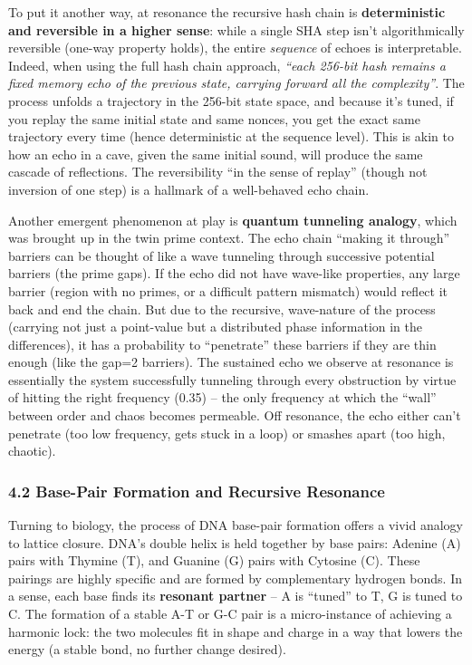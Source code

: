 \documentclass[11pt]{article}
\begin{document}
To put it another way, at resonance the recursive hash chain is
\textbf{deterministic and reversible in a higher sense}: while a single
SHA step isn't algorithmically reversible (one-way property holds), the
entire \emph{sequence} of echoes is interpretable. Indeed, when using
the full hash chain approach, \emph{``each 256-bit hash remains a fixed
memory echo of the previous state, carrying forward all the
complexity''}. The process unfolds a trajectory in the 256-bit state
space, and because it's tuned, if you replay the same initial state and
same nonces, you get the exact same trajectory every time (hence
deterministic at the sequence level). This is akin to how an echo in a
cave, given the same initial sound, will produce the same cascade of
reflections. The reversibility ``in the sense of replay'' (though not
inversion of one step) is a hallmark of a well-behaved echo chain.

Another emergent phenomenon at play is \textbf{quantum tunneling
analogy}, which was brought up in the twin prime context. The echo chain
``making it through'' barriers can be thought of like a wave tunneling
through successive potential barriers (the prime gaps). If the echo did
not have wave-like properties, any large barrier (region with no primes,
or a difficult pattern mismatch) would reflect it back and end the
chain. But due to the recursive, wave-nature of the process (carrying
not just a point-value but a distributed phase information in the
differences), it has a probability to ``penetrate'' these barriers if
they are thin enough (like the gap=2 barriers). The sustained echo we
observe at resonance is essentially the system successfully tunneling
through every obstruction by virtue of hitting the right frequency
(0.35) -- the only frequency at which the ``wall'' between order and
chaos becomes permeable. Off resonance, the echo either can't penetrate
(too low frequency, gets stuck in a loop) or smashes apart (too high,
chaotic).

\hypertarget{base-pair-formation-and-recursive-resonance}{%
\subsubsection{4.2 Base-Pair Formation and Recursive
Resonance}\label{base-pair-formation-and-recursive-resonance}}

Turning to biology, the process of DNA base-pair formation offers a
vivid analogy to lattice closure. DNA's double helix is held together by
base pairs: Adenine (A) pairs with Thymine (T), and Guanine (G) pairs
with Cytosine (C). These pairings are highly specific and are formed by
complementary hydrogen bonds. In a sense, each base finds its
\textbf{resonant partner} -- A is ``tuned'' to T, G is tuned to C. The
formation of a stable A-T or G-C pair is a micro-instance of achieving a
harmonic lock: the two molecules fit in shape and charge in a way that
lowers the energy (a stable bond, no further change desired).
\end{document}
